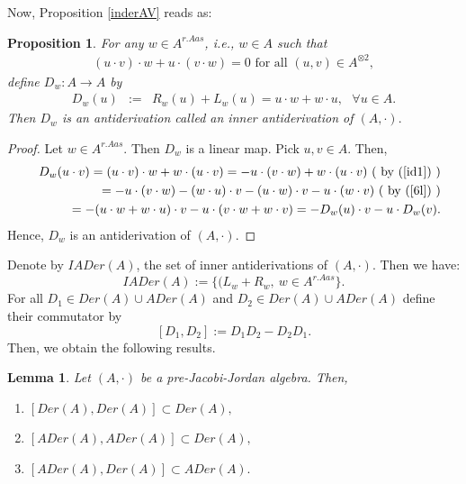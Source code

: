 \documentclass[12pt]{amsart}
\newtheorem{lemma}[Theorem]{Lemma}
\newtheorem{proposition}[Theorem]{Proposition}
\begin{document}
	Now, Proposition \ref{inderAV} reads as:
	\begin{proposition}
		For any $w\in A^{r.Aas}$, i.e., $w\in A$ such that
		\begin{eqnarray}
			(u\cdot v)\cdot w+u\cdot (v\cdot w)=0 \mbox{ for all $(u,v)\in A^{\otimes 2} $},\label{id1}
		\end{eqnarray}
		define 
		$D_w: A\rightarrow A $ by
		\begin{eqnarray}
			D_w(u)&:=&R_w(u)+L_w(u)
			=u\cdot w +w\cdot u, \mbox{    $\forall u\in A$}.\label{id2}
		\end{eqnarray}
		Then $D_w$ is an antiderivation  called an inner antiderivation of $(A,\cdot).$
	\end{proposition}
	\begin{proof}
		Let $w\in A^{r.Aas}.$ Then $D_w$ is a linear map.
		Pick $u,v\in A.$ Then,
		\begin{eqnarray}
			&&	D_w(u\cdot v)=(u\cdot v)\cdot w+w\cdot (u\cdot v)=-u\cdot(v\cdot w)+w\cdot (u\cdot v) \mbox{ ( by (\ref{id1}) )}\nonumber\\
			&&=-u\cdot(v\cdot w)-(w\cdot u)\cdot v-(u\cdot w)\cdot v-u\cdot (w\cdot v) \mbox{ ( by (\ref{6l}) )}\nonumber\\
			&&= -(u\cdot w+w\cdot u)\cdot v-u\cdot (v\cdot w+w\cdot v)=-D_w(u)\cdot v-u\cdot D_w(v).\nonumber
		\end{eqnarray}
		Hence, $D_w $ is an antiderivation of $(A,\cdot)$. 
	\end{proof}
	Denote by $IADer(A)$, the set of inner antiderivations of $(A,\cdot).$  Then we have:
	$$IADer(A):=
	\{(L_w+R_w,\ w\in A^{r.Aas}\}.$$
	For all $D_1\in Der(A)\cup ADer(A)$ and $D_2\in Der(A)\cup ADer(A)$ define their  commutator by
	$$[D_1,D_2]:=D_1D_2-D_2D_1.$$
	Then, we obtain the following results.
	\begin{lemma}
		Let $(A,\cdot)$ be a pre-Jacobi-Jordan algebra. Then,
		\begin{enumerate}
			\item $[Der(A),Der(A)]\subset Der(A),$
			\item $[ADer(A),ADer(A)]\subset Der(A),$
			\item $[ADer(A),Der(A)]\subset ADer(A).$
		\end{enumerate}
	\end{lemma}
\end{document}
